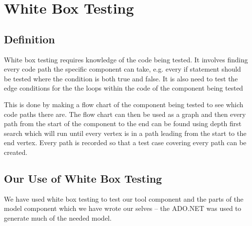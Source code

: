 \chapter{White Box Testing}
\label{chap:whiteBox}
\section{Definition}
White box testing requires knowledge of the code being tested.
It involves finding every code path the specific component can take, e.g. every if statement should be tested where the condition is both true and false.
It is also need to test the edge conditions for the the loops within the code of the component being tested

This is done by making a flow chart of the component being tested to see which code paths there are.
The flow chart can then be used as a graph and then every path from the start of the component to the end can be found using depth first search which will run until every vertex is in a path leading from the start to the end vertex.
Every path is recorded so that a test case covering every path can be created.
\cite{whiteBox}

\section{Our Use of White Box Testing}
We have used white box testing to test our tool component and the parts of the model component which we have wrote our selves -- the ADO.NET was used to generate much of the needed model.

\myTail{}